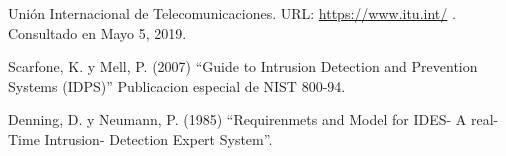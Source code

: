 
% 

\begin{thebibliography}{99}
    
     Unión Internacional de Telecomunicaciones. URL: \href{https://www.itu.int/en/ITU-D/Statistics/Pages/facts/default.aspx}{https://www.itu.int/} . Consultado en Mayo 5, 2019.

     Scarfone, K. y Mell, P. (2007) “Guide to Intrusion Detection and Prevention Systems (IDPS)” Publicacion especial de NIST 800-94.

     Denning, D. y Neumann, P. (1985) “Requirenmets and Model for IDES- A real- Time Intrusion- Detection Expert System”.
    
\end{thebibliography}

